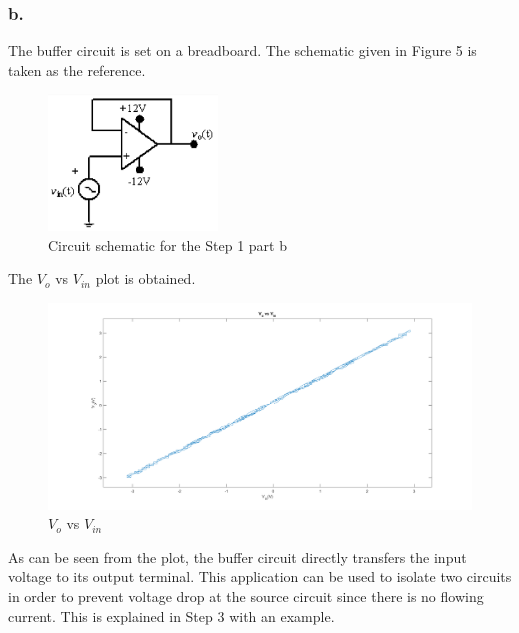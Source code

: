 \documentclass[letterpaper,12pt]{article}
\begin{document}
\subsubsection{b.}
The buffer circuit is set on a breadboard. The schematic given in Figure 5 is taken as the reference.
\begin{figure}[H]
	\centering
   \includegraphics[width=0.4\textwidth]{circuit2.png}
   \caption{Circuit schematic for the Step 1 part b}
\end{figure} 
The \(V_{o} \) vs \( V_{in}\) plot is obtained. 
\begin{figure}[H]
	\centering
   \includegraphics[width=1\textwidth]{e_1_b.png}
   \caption{\(V_{o} \) vs \( V_{in}\)}
\end{figure} 
As can be seen from the plot, the buffer circuit directly transfers the input voltage to its output terminal. This application can be used to isolate two circuits in order to prevent voltage drop at the source circuit since there is no flowing current. This is explained in Step 3 with an example. 
\end{document}
